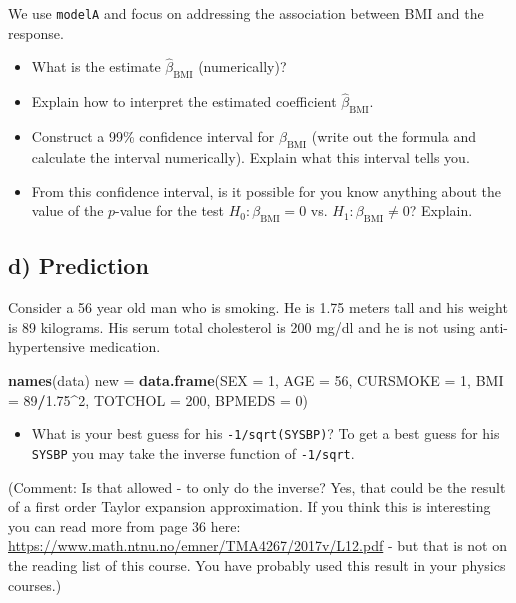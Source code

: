 \documentclass[]{article}
\newenvironment{Shaded}{\begin{snugshade}}{\end{snugshade}}
\newcommand{\KeywordTok}[1]{\textcolor[rgb]{0.13,0.29,0.53}{\textbf{#1}}}
\newcommand{\DataTypeTok}[1]{\textcolor[rgb]{0.13,0.29,0.53}{#1}}
\newcommand{\DecValTok}[1]{\textcolor[rgb]{0.00,0.00,0.81}{#1}}
\newcommand{\FloatTok}[1]{\textcolor[rgb]{0.00,0.00,0.81}{#1}}
\newcommand{\StringTok}[1]{\textcolor[rgb]{0.31,0.60,0.02}{#1}}
\newcommand{\OperatorTok}[1]{\textcolor[rgb]{0.81,0.36,0.00}{\textbf{#1}}}
\newcommand{\NormalTok}[1]{#1}
\providecommand{\tightlist}{%
  \setlength{\itemsep}{0pt}\setlength{\parskip}{0pt}}
\begin{document}
We use \texttt{modelA} and focus on addressing the association between
BMI and the response.

\begin{itemize}
\tightlist
\item
  What is the estimate \(\hat{\beta}_{\text{BMI}}\) (numerically)?
\item
  Explain how to interpret the estimated coefficient
  \(\hat{\beta}_{\text{BMI}}\).
\item
  Construct a 99\% confidence interval for \(\beta_{\text{BMI}}\) (write
  out the formula and calculate the interval numerically). Explain what
  this interval tells you.
\item
  From this confidence interval, is it possible for you know anything
  about the value of the \(p\)-value for the test
  \(H_0: \beta_{\text{BMI}}=0\) vs. \(H_1:\beta_{\text{BMI}} \neq 0\)?
  Explain.
\end{itemize}

\subsection{d) Prediction}\label{d-prediction}

Consider a 56 year old man who is smoking. He is 1.75 meters tall and
his weight is 89 kilograms. His serum total cholesterol is 200 mg/dl and
he is not using anti-hypertensive medication.

\begin{Shaded}
\begin{Highlighting}[]
\KeywordTok{names}\NormalTok{(data)}
\NormalTok{new =}\StringTok{ }\KeywordTok{data.frame}\NormalTok{(}\DataTypeTok{SEX =} \DecValTok{1}\NormalTok{, }\DataTypeTok{AGE =} \DecValTok{56}\NormalTok{, }\DataTypeTok{CURSMOKE =} \DecValTok{1}\NormalTok{, }\DataTypeTok{BMI =} \DecValTok{89}\OperatorTok{/}\FloatTok{1.75}\OperatorTok{^}\DecValTok{2}\NormalTok{, }\DataTypeTok{TOTCHOL =} \DecValTok{200}\NormalTok{, }
    \DataTypeTok{BPMEDS =} \DecValTok{0}\NormalTok{)}
\end{Highlighting}
\end{Shaded}

\begin{itemize}
\tightlist
\item
  What is your best guess for his \texttt{-1/sqrt(SYSBP)}? To get a best
  guess for his \texttt{SYSBP} you may take the inverse function of
  \texttt{-1/sqrt}.
\end{itemize}

(Comment: Is that allowed - to only do the inverse? Yes, that could be
the result of a first order Taylor expansion approximation. If you think
this is interesting you can read more from page 36 here:
\url{https://www.math.ntnu.no/emner/TMA4267/2017v/L12.pdf} - but that is
not on the reading list of this course. You have probably used this
result in your physics courses.)
\end{document}
